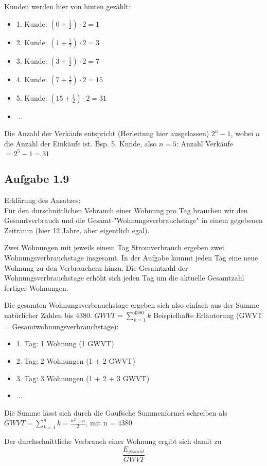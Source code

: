 \documentclass{standalone}
\begin{document}
Kunden werden hier von hinten gezählt:
\begin{itemize}
    \item 1. Kunde: $(0 + \frac{1}{2}) \cdot 2 = 1$
    \item 2. Kunde: $(1 + \frac{1}{2}) \cdot 2 = 3$
    \item 3. Kunde: $(3 + \frac{1}{2}) \cdot 2 = 7$
    \item 4. Kunde: $(7 + \frac{1}{2}) \cdot 2 = 15$
    \item 5. Kunde: $(15 + \frac{1}{2}) \cdot 2 = 31$
    \item ...
\end{itemize}
Die Anzahl der Verkäufe entspricht (Herleitung hier ausgelassen) $2^n-1$, wobei $n$ die Anzahl der Einkäufe ist. 
Bsp. 5. Kunde, also $n = 5$: Anzahl Verkäufe $= 2^5-1 = 31$

\subsection{Aufgabe 1.9}
Erklärung des Ansatzes: \\
Für den durschnittlichen Vebrauch einer Wohnung pro Tag brauchen wir den Gesamtverbrauch und die Gesamt-"Wohnungsverbrauchstage" in einem gegebenen Zeitraum (hier 12 Jahre, aber eigentlich egal).

Zwei Wohnungen mit jeweils einem Tag Stromverbrauch ergeben zwei Wohnungsverbrauchstage insgesamt.
In der Aufgabe kommt jeden Tag eine neue Wohnung zu den Verbrauchern hinzu. Die Gesamtzahl der Wohnungsverbrauchstage erhöht sich jeden Tag um die aktuelle Gesamtzahl fertiger Wohnungen.

Die gesamten Wohnungsverbrauchstage ergeben sich also einfach aus der Summe natürlicher Zahlen bis 4380.
$ GWVT = \sum_{k=1}^{4380}k$
Beispielhafte Erläuterung (GWVT = Gesamtwohnungsverbrauchstage):
\begin{itemize}
    \item 1. Tag: 1 Wohnung (1 GWVT)
    \item 2. Tag: 2 Wohnungen (1 + 2 GWVT)
    \item 3. Tag: 3 Wohnungen (1 + 2 + 3 GWVT)
    \item ...
\end{itemize}
Die Summe lässt sich durch die Gaußsche Summenformel schreiben als
$ GWVT = \sum_{k=1}^{n}k = \frac{n^2+n}{2}$, mit n = 4380

Der durchschnittliche Verbrauch einer Wohnung ergibt sich damit zu
$$\frac{E_{gesamt}}{GWVT}$$
\end{document}
